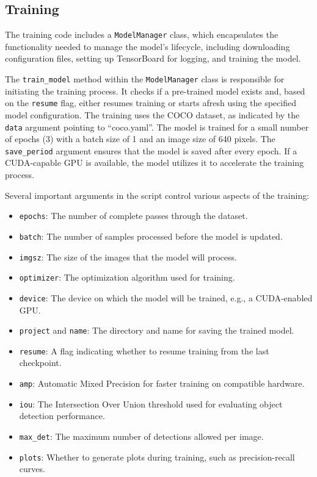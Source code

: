 \documentclass[10pt]{extarticle}
\begin{document}
\subsection{Training}

The training code includes a \texttt{ModelManager} class, which encapsulates the functionality needed to manage the model's lifecycle, including downloading configuration files, setting up TensorBoard for logging, and training the model.

The \texttt{train\_model} method within the \texttt{ModelManager} class is responsible for initiating the training process. It checks if a pre-trained model exists and, based on the \texttt{resume} flag, either resumes training or starts afresh using the specified model configuration. The training uses the COCO dataset, as indicated by the \texttt{data} argument pointing to ``coco.yaml''. The model is trained for a small number of epochs (3) with a batch size of 1 and an image size of 640 pixels. The \texttt{save\_period} argument ensures that the model is saved after every epoch. If a CUDA-capable GPU is available, the model utilizes it to accelerate the training process.

Several important arguments in the script control various aspects of the training:

\begin{itemize}
    \item \texttt{epochs}: The number of complete passes through the dataset.
    \item \texttt{batch}: The number of samples processed before the model is updated.
    \item \texttt{imgsz}: The size of the images that the model will process.
    \item \texttt{optimizer}: The optimization algorithm used for training.
    \item \texttt{device}: The device on which the model will be trained, e.g., a CUDA-enabled GPU.
    \item \texttt{project} and \texttt{name}: The directory and name for saving the trained model.
    \item \texttt{resume}: A flag indicating whether to resume training from the last checkpoint.
    \item \texttt{amp}: Automatic Mixed Precision for faster training on compatible hardware.
    \item \texttt{iou}: The Intersection Over Union threshold used for evaluating object detection performance.
    \item \texttt{max\_det}: The maximum number of detections allowed per image.
    \item \texttt{plots}: Whether to generate plots during training, such as precision-recall curves.
\end{itemize}
\end{document}
